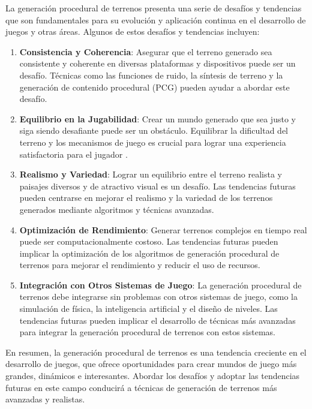 La generación procedural de terrenos presenta una serie de desafíos y tendencias que son fundamentales para su evolución y aplicación continua en el desarrollo de juegos y otras áreas. Algunos de estos desafíos y tendencias incluyen:

\begin{enumerate}
    \item \textbf{Consistencia y Coherencia}: Asegurar que el terreno generado sea consistente y coherente en diversas plataformas y dispositivos puede ser un desafío. Técnicas como las funciones de ruido, la síntesis de terreno y la generación de contenido procedural (PCG) pueden ayudar a abordar este desafío\cite{ConsistencyCoherence}.
    
    \item \textbf{Equilibrio en la Jugabilidad}: Crear un mundo generado que sea justo y siga siendo desafiante puede ser un obstáculo. Equilibrar la dificultad del terreno y los mecanismos de juego es crucial para lograr una experiencia satisfactoria para el jugador \cite{BalancedGameplay}.
    
    \item \textbf{Realismo y Variedad}: Lograr un equilibrio entre el terreno realista y paisajes diversos y de atractivo visual es un desafío. Las tendencias futuras pueden centrarse en mejorar el realismo y la variedad de los terrenos generados mediante algoritmos y técnicas avanzadas\cite{RealismVariety}.
    
    \item \textbf{Optimización de Rendimiento}: Generar terrenos complejos en tiempo real puede ser computacionalmente costoso. Las tendencias futuras pueden implicar la optimización de los algoritmos de generación procedural de terrenos para mejorar el rendimiento y reducir el uso de recursos\cite{PerformanceOptimization}.
    
    \item \textbf{Integración con Otros Sistemas de Juego}: La generación procedural de terrenos debe integrarse sin problemas con otros sistemas de juego, como la simulación de física, la inteligencia artificial y el diseño de niveles. Las tendencias futuras pueden implicar el desarrollo de técnicas más avanzadas para integrar la generación procedural de terrenos con estos sistemas\cite{IntegrationWithGameSystems}.
\end{enumerate}

En resumen, la generación procedural de terrenos es una tendencia creciente en el desarrollo de juegos, que ofrece oportunidades para crear mundos de juego más grandes, dinámicos e interesantes. Abordar los desafíos y adoptar las tendencias futuras en este campo conducirá a técnicas de generación de terrenos más avanzadas y realistas.


